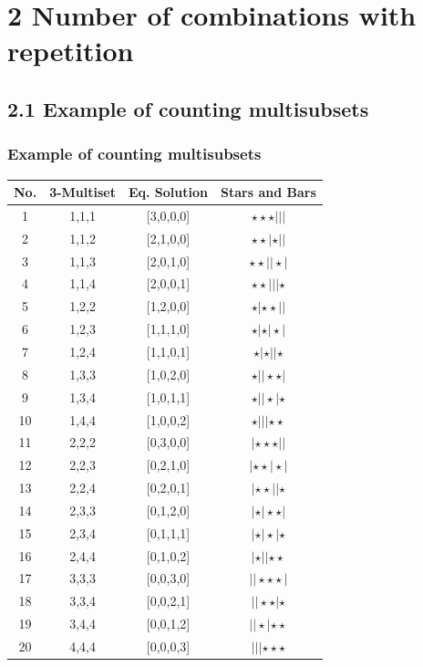 \documentclass{beamer}
\begin{document}
\section{2 Number of combinations with repetition}
\subsection{2.1 Example of counting multisubsets}
\begin{frame}
\frametitle{Example of counting multisubsets}
\footnotesize
{
\begin{table}[h]
\centering
\begin{tabular}{|c|c|c|c|}
\hline
No. & 3-Multiset & Eq. Solution & Stars and Bars \\
\hline
1&{1,1,1} &[3,0,0,0]&$\star \star \star |||$\\
\hline
2 &{1,1,2} &[2,1,0,0] &$\star \star |\star ||$\\
\hline
3&	{1,1,3}&	[2,0,1,0]&	$\star \star ||\star |$\\
\hline
4&	{1,1,4}&	[2,0,0,1]&	$\star \star |||\star$ \\
\hline
5&	{1,2,2}&	[1,2,0,0]&	$\star |\star \star ||$\\
\hline
6&	{1,2,3}&	[1,1,1,0]&	$\star |\star |\star |$\\
\hline
7&	{1,2,4}&	[1,1,0,1]&	$\star |\star ||\star$ \\
\hline
8&	{1,3,3}&	[1,0,2,0]&	$\star ||\star \star |$\\
\hline
9&	{1,3,4}&	[1,0,1,1]& $\star ||\star |\star$ \\
\hline
10&	{1,4,4}&	[1,0,0,2]&	$\star |||\star \star$ \\
\hline
11&	{2,2,2}&	[0,3,0,0]&	$|\star \star \star ||$\\
\hline
12&	{2,2,3}&	[0,2,1,0]&	$|\star \star |\star |$\\
\hline
13&	{2,2,4}&	[0,2,0,1]&	$|\star \star ||\star$ \\
\hline
14&	{2,3,3}&	[0,1,2,0]&	$|\star |\star \star |$\\
\hline
15&	{2,3,4}&	[0,1,1,1]&	$|\star |\star |\star$ \\
\hline
16&	{2,4,4}&	[0,1,0,2]&	$|\star ||\star \star$ \\
\hline
17&	{3,3,3}&	[0,0,3,0]&	$||\star \star \star |$\\
\hline
18&	{3,3,4}&	[0,0,2,1]&	$||\star \star |\star$ \\
\hline
19&	{3,4,4} &	[0,0,1,2]&	$||\star |\star \star$ \\
\hline 
20 &	{4,4,4} &	[0,0,0,3] &$|||\star \star \star$ \\
\hline
\end{tabular}
\end{table}
}
\end{frame}
\end{document}
